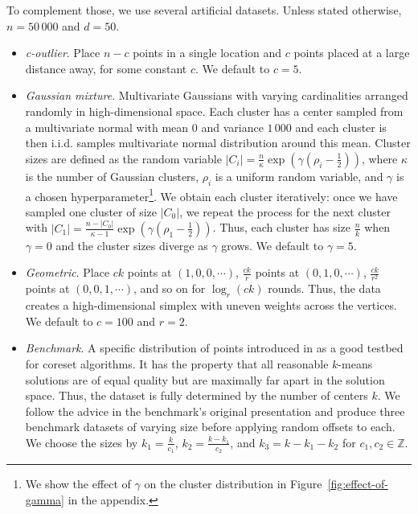 To complement those, we use several artificial datasets. Unless stated otherwise, $n = 50\,000$ and $d=50$.
\begin{itemize}
    \item \emph{c-outlier}. Place $n-c$ points in a single location and $c$ points placed at a large distance away, for some constant $c$. We default to $c=5$.

    \item \emph{Gaussian mixture}.  Multivariate Gaussians with varying cardinalities arranged randomly in high-dimensional space.  Each cluster has a center
        sampled from a multivariate normal with mean $0$ and variance $1\,000$ and each cluster is then i.i.d. samples multivariate normal distribution around
        this mean. Cluster sizes are defined as the random variable $|C_i| = \frac{n}{\kappa} \exp \left( \gamma(\rho_i - \frac{1}{2}) \right)$, where $\kappa$
        is the number of Gaussian clusters, $\rho_i$ is a uniform random variable, and $\gamma$ is a chosen hyperparameter\footnote{We show the effect of
        $\gamma$ on the cluster distribution in Figure~\ref{fig:effect-of-gamma} in the appendix.}. We obtain each cluster iteratively: once we have sampled one cluster of size
        $|C_0|$, we repeat the process for the next cluster with $|C_1| = \frac{n - |C_0|}{\kappa-1}\exp \left( \gamma(\rho_1 - \frac{1}{2}) \right)$.  Thus,
        each cluster has size $\frac{n}{k}$ when $\gamma = 0$ and the cluster sizes diverge as $\gamma$ grows. We default to $\gamma = 5$.

    \item \emph{Geometric}. Place $c k$ points at $(1, 0, 0, \cdots)$, $\frac{ck}{r}$ points at $(0, 1, 0, \cdots)$, $\frac{ck}{r^2}$ points
        at $(0, 0, 1, \cdots)$, and so on for $\log_r (ck)$ rounds. Thus, the data creates a high-dimensional simplex with uneven weights across the vertices. We
        default to $c = 100$ and $r=2$. 

    \item \emph{Benchmark}. A specific distribution of points introduced in \cite{chrisESA} as a good testbed for coreset algorithms.  It has the property that
        all reasonable $k$-means solutions are of equal quality but are maximally far apart in the solution space. Thus, the dataset is fully determined by the
        number of centers $k$. We follow the advice in the benchmark's original presentation and produce three benchmark datasets of varying size before
        applying random offsets to each. We choose the sizes by $k_1 = \frac{k}{c_1}$, $k_2 = \frac{k - k_1}{c_2}$, and $k_3 = k - k_1 - k_2$ for $c_1, c_2 \in
        \mathbb{Z}$.

\end{itemize}

